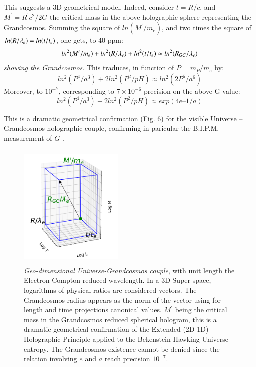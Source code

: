 \documentclass[twoside,draft]{article}
\begin{document}
\begin{sloppypar}
This suggests a 3D geometrical model. Indeed, consider $t =R/c$, and $M^{\prime} = R^{\prime} c^{2} /2G$ the critical mass in the above holographic sphere representing the Grandcosmos. Summing the square of $ln(M^{\prime}/m_{e} )$, and two times the square of $ln(R/\lambdabar_{e} ) = ln(t/t_{e} )$, one gets, to 40 ppm:
\begin{equation}
ln^{2} (M^{\prime}/m_{e} ) + ln^{2} (R/\lambdabar_{e}) + ln^2 (t/t_{e} ) \approx ln^2 (R_{GC} /\lambdabar_{e} )
\end{equation} 
\textit{showing the Grandcosmos}. This traduces, in function of $P = m_P/m_e$ by:
\begin{equation}
ln^2(P^4/a^3) + 2 ln^2(P^2/pH) \approx ln^2(2P^5/a^6)
\end{equation}
Moreover, to $10^{-7}$, corresponding to $7 \times 10^{-6}$ precision on the above G value:
\begin{equation}
ln^2(P^4/a^3) + 2 ln^2(P^2/pH) \approx exp(4e – 1/a)
\end{equation}
 
This is a dramatic geometrical confirmation (Fig. 6) for the visible Universe – Grandcosmos holographic couple, confirming in paricular the B.I.P.M. measurement of $G$ \cite{Quinn}.


\begin{figure}[h]
\centering
\includegraphics[width=5cm,height=6cm]{./figures/triaxis.png}
\caption {\textit{Geo-dimensional Universe-Grandcosmos couple}, with unit length the Electron Compton reduced wavelength. 
In a 3D Super-space, logarithms of physical ratios are considered vectors. The Grandcosmos radius appears as the norm of the vector using for length and time projections canonical values.
$M^{\prime}$ being the critical mass in the Grandcosmos reduced spherical hologram, this is a dramatic geometrical confirmation of the Extended (2D-1D) Holographic Principle applied to the Bekenstein-Hawking Universe entropy. The Grandcosmos existence cannot be denied since the relation involving $e$ and $a$ reach precision $10^{-7}$.} 
\end{figure}


\end{sloppypar}
\end{document}
